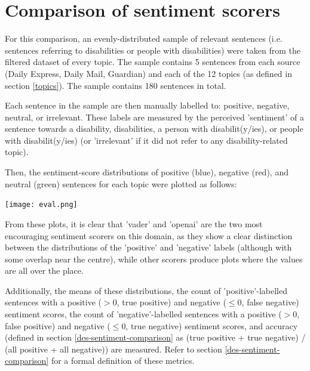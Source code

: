 \documentclass{report}
\begin{document}
\section{Comparison of sentiment scorers} \label{Comparison of sentiment scorers}
For this comparison, an evenly-distributed sample of relevant sentences (i.e. sentences referring to disabilities or people with disabilities) were taken from the filtered dataset of every topic. 
The sample contains 5 sentences from each source (Daily Express, Daily Mail, Guardian) and each of the 12 topics (as defined in section \ref{topics}). %
The sample contains 180 sentences in total. %

Each sentence in the sample are then manually labelled to: positive, negative, neutral, or irrelevant.
These labels are measured by the perceived 'sentiment' of a sentence towards a disability, disabilities, a person with disabilit(y/ies), or people with disabilit(y/ies) (or 'irrelevant' if it did not refer to any disability-related topic).

Then, the sentiment-score distributions of positive (blue), negative (red), and neutral (green) sentences for each topic were plotted as follows:

\noindent
\texttt{[image: eval.png]}

From these plots, it is clear that 'vader' and 'openai' are the two most encouraging sentiment scorers on this domain, as they show a clear distinction between the distributions of the 'positive' and 'negative' labels (although with some overlap near the centre), while other scorers produce plots where the values are all over the place.

Additionally, the means of these distributions, the count of 'positive'-labelled sentences with a positive ($>$0, true positive) and negative ($\le$0, false negative) sentiment scores, the count of 'negative'-labelled sentences with a positive ($>$0, false positive) and negative ($\le$0, true negative) sentiment scores, and accuracy (defined in section \ref{des-sentiment-comparison} as (true positive + true negative) / (all positive + all negative)) are measured.
Refer to section \ref{des-sentiment-comparison} for a formal definition of these metrics.
\end{document}
